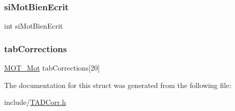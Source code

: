 \mbox{\label{struct_correction_a5c8c9153308e1bff754421d05d846cb7}} 
\subsubsection{\texorpdfstring{si\+Mot\+Bien\+Ecrit}{siMotBienEcrit}}
{\footnotesize\ttfamily int si\+Mot\+Bien\+Ecrit}

\mbox{\label{struct_correction_aece7d22ea125eca3e364ec39d004b6f4}} 
\subsubsection{\texorpdfstring{tab\+Corrections}{tabCorrections}}
{\footnotesize\ttfamily \hyperlink{_mot_8h_af7ff2707bf2a933895e650ae9490ca4d}{M\+O\+T\+\_\+\+Mot} tab\+Corrections\mbox{[}20\mbox{]}}



The documentation for this struct was generated from the following file\+:\begin{DoxyCompactItemize}
\item 
include/\hyperlink{_t_a_d_corr_8h}{T\+A\+D\+Corr.\+h}\end{DoxyCompactItemize}
